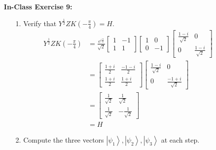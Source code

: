 \documentclass[main.tex]{subfiles}
\begin{document}
\begin{enumerate}
\item[] \textbf{In-Class Exercise 9:} 
\begin{enumerate}
    \item [1.] Verify that $Y^{\frac{1}{2}} Z K\left(-\frac{\pi}{4}\right)=H$.
    \begin{align*}
        Y^{\frac{1}{2}} Z K\left(-\frac{\pi}{4}\right)  & = \frac{e^{i\frac{\pi}{4}}}{\sqrt{2}}
                                                        \left[\begin{array}{ll}1&-1\\1&1\end{array}\right]
                                                        \left[\begin{array}{ll}1 & 0 \\ 0 & -1 \end{array}\right]
                                                        \left[\begin{array}{ll}\frac{1-i}{\sqrt{2}} & 0 \\ 
                                                        0 & \frac{1-i}{\sqrt{2}}\end{array}\right]\\
                                                        & = \left[\begin{array}{ll}\frac{1+i}{2} & \frac{-1-i}{2}\\
                                                        \frac{1+i}{2} & \frac{1+i}{2}\end{array}\right]
                                                        \left[\begin{array}{ll}\frac{1-i}{\sqrt{2}} & 0 \\ 
                                                        0 & \frac{-1+i}{\sqrt{2}}\end{array}\right]\\
                                                        & = \left[\begin{array}{cc} \frac{1}{\sqrt{2}} & \frac{1}{\sqrt{2}} \\ \frac{1}{\sqrt{2}} & -\frac{1}{\sqrt{2}} \end{array}\right]\\
                                                        & = H
    \end{align*}
    \item [2.] Compute the three vectors $\left|\psi_{1}\right\rangle,\left|\psi_{2}\right\rangle,\left|\psi_{3}\right\rangle$ at each step.

\end{enumerate}
\end{enumerate}
\end{document}
